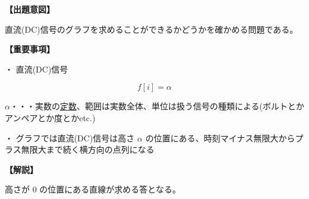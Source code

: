 \noindent \textbf{【出題意図】}

\noindent 直流(DC)信号のグラフを求めることができるかどうかを確かめる問題である。

\vspace{1em}
\noindent \textbf{【重要事項】}

\medskip
\noindent・ 直流(DC)信号

\[
f[i] = \alpha
\]

\bigskip
\noindent $\alpha$・・・実数の\underline{定数}、範囲は実数全体、単位は扱う信号の種類による(ボルトとかアンペアとか度とかetc.)

\bigskip
\noindent・ グラフでは直流(DC)信号は高さ $\alpha$ の位置にある、時刻マイナス無限大からプラス無限大まで続く横方向の点列になる

\vspace{1em}
\noindent \textbf{【解説】}

\noindent 高さが $0$ の位置にある直線が求める答となる。

